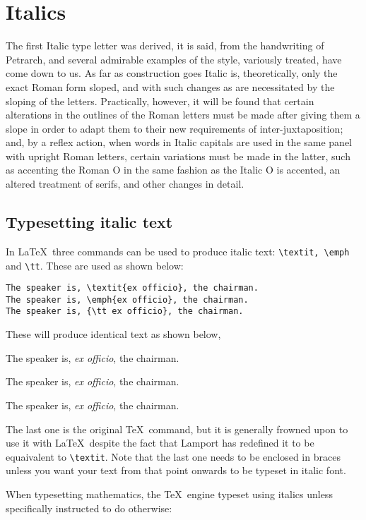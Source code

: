 \chapter{Italics}

The first Italic type letter was derived, it is said, from the handwriting of Petrarch, and several admirable examples of the style, variously treated, have come down to us. As far as construction goes Italic is, theoretically, only the exact Roman form sloped, and with such changes as are necessitated by the sloping of the letters. Practically, however, it will be found that certain alterations in the outlines of the Roman letters must be made after giving them a slope in order to adapt them to their new requirements of inter-juxtaposition; and, by a reflex action, when words in Italic capitals are used in the same panel with upright Roman letters, certain variations must be made in the latter, such as accenting the Roman O in the same fashion as the Italic O is accented, an altered treatment of serifs, and other changes in detail.

\section{Typesetting italic text}
In \LaTeX\ three commands can be used to produce italic text: \verb+\textit, \emph+ and  \verb+\tt+. These are used as shown below:


\begin{verbatim}
The speaker is, \textit{ex officio}, the chairman.
The speaker is, \emph{ex officio}, the chairman.
The speaker is, {\tt ex officio}, the chairman.
\end{verbatim}

These will produce identical text as shown below,
\smallskip

\qquad  The speaker is, \textit{ex officio}, the chairman.

\qquad The speaker is, \emph{ex officio}, the chairman.

\qquad The speaker is, {\it ex officio}, the chairman.
\smallskip

The last one is the original \TeX\ command, but it is generally frowned upon to use it with \LaTeX\ despite the fact that Lamport has redefined it to be equaivalent to \verb+\textit+. Note that the last one needs to be enclosed in
braces unless you want your text from that point onwards to be typeset in italic font.

When typesetting mathematics, the \TeX\ engine typeset using italics unless specifically instructed to do otherwise:

